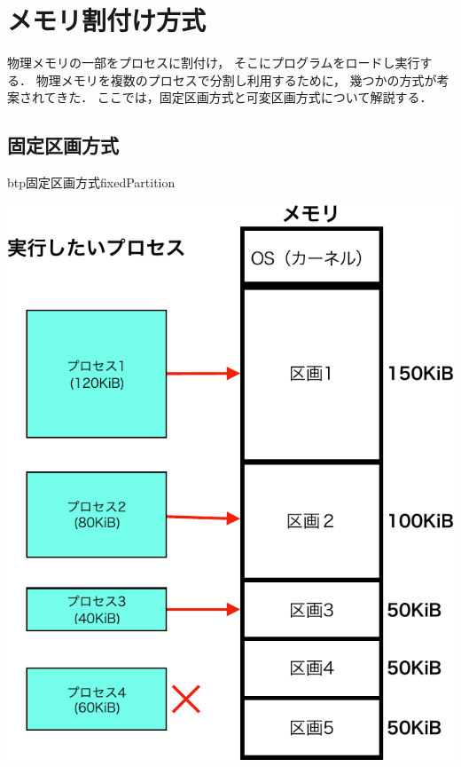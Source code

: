 \chapter{メモリ割付け方式}
物理メモリの一部をプロセスに割付け，
そこにプログラムをロードし実行する．
物理メモリを複数のプロセスで分割し利用するために，
幾つかの方式が考案されてきた．
ここでは，固定区画方式と可変区画方式について解説する．

\section{固定区画方式}

\begin{myfig}{btp}{固定区画方式}{fixedPartition}
  \begin{minipage}{0.49\columnwidth}
    \begin{center}
      \includegraphics[scale=0.66]{Fig/fixedPartitionLoad-crop.pdf}

\end{center}
\end{minipage}
\end{myfig}
